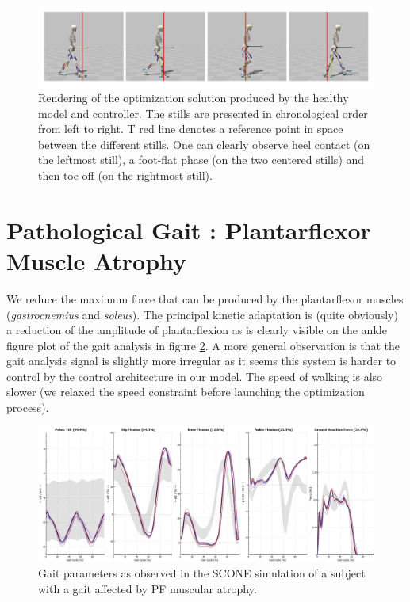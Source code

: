 \documentclass[11pt]{article}
\begin{document}
\begin{figure}[h!]
    \centering
    \includegraphics[width=\textwidth]{screens/healthy_render.jpg}
    \caption{Rendering of the optimization solution produced by the healthy model and controller. The stills are presented in chronological order from left to right. T red line denotes a reference point in space between the different stills. One can clearly observe heel contact (on the leftmost still), a foot-flat phase (on the two centered stills) and then toe-off (on the rightmost still).}
    \label{healthy_render}
\end{figure}

\section{Pathological Gait : Plantarflexor Muscle Atrophy}

We reduce the maximum force that can be produced by the plantarflexor muscles (\textit{gastrocnemius} and \textit{soleus}). The principal kinetic adaptation is (quite obviously) a reduction of the amplitude of plantarflexion as is clearly visible on the ankle figure plot of the gait analysis in figure \ref{atrophic_gait}. A more general observation is that the gait analysis signal is slightly more irregular as it seems this system is harder to control by the control architecture in our model. The speed of walking is also slower (we relaxed the speed constraint before launching the optimization process).

\begin{figure}[h!]
    \centering
    \includegraphics[width=\textwidth]{screens/atrophy_gait.png}
    \caption{Gait parameters as observed in the SCONE simulation of a subject with a gait affected by PF muscular atrophy.}
    \label{atrophic_gait}
\end{figure}
\end{document}
